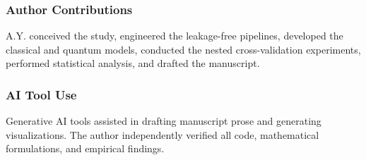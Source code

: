 \documentclass[conference]{IEEEtran}
\begin{document}
\subsubsection*{Author Contributions}
A.Y. conceived the study, engineered the leakage-free pipelines, developed the classical and quantum models, conducted the nested cross-validation experiments, performed statistical analysis, and drafted the manuscript.

\subsubsection*{AI Tool Use}
Generative AI tools assisted in drafting manuscript prose and generating visualizations. The author independently verified all code, mathematical formulations, and empirical findings.

\balance
\end{document}
